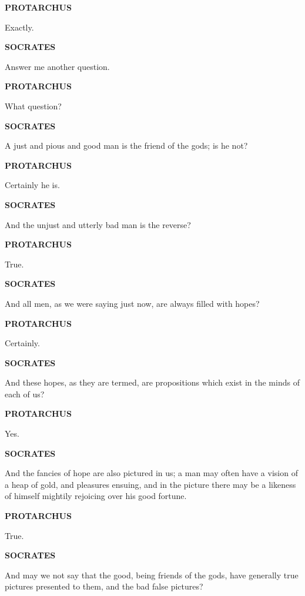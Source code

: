 \documentclass[11pt,letter]{article}
\begin{document}
\par \textbf{PROTARCHUS}
\par   Exactly.

\par \textbf{SOCRATES}
\par   Answer me another question.

\par \textbf{PROTARCHUS}
\par   What question?

\par \textbf{SOCRATES}
\par   A just and pious and good man is the friend of the gods; is he not?

\par \textbf{PROTARCHUS}
\par   Certainly he is.

\par \textbf{SOCRATES}
\par   And the unjust and utterly bad man is the reverse?

\par \textbf{PROTARCHUS}
\par   True.

\par \textbf{SOCRATES}
\par   And all men, as we were saying just now, are always filled with hopes?

\par \textbf{PROTARCHUS}
\par   Certainly.

\par \textbf{SOCRATES}
\par   And these hopes, as they are termed, are propositions which exist in the minds of each of us?

\par \textbf{PROTARCHUS}
\par   Yes.

\par \textbf{SOCRATES}
\par   And the fancies of hope are also pictured in us; a man may often have a vision of a heap of gold, and pleasures ensuing, and in the picture there may be a likeness of himself mightily rejoicing over his good fortune.

\par \textbf{PROTARCHUS}
\par   True.

\par \textbf{SOCRATES}
\par   And may we not say that the good, being friends of the gods, have generally true pictures presented to them, and the bad false pictures?
\end{document}
